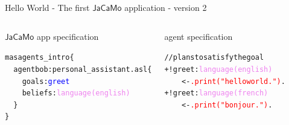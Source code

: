 \documentclass[compress]{beamer}
\newcommand{\jacamo}{$\mathsf{JaCaMo}$\xspace}
\newcommand{\planhead}[1]{\textcolor{indiagreen}{#1}}
\newcommand{\desire}[1]{\textcolor{blue}{#1}}
\newcommand{\instruction}[1]{\textcolor{red}{#1}}
\newcommand{\comment}[1]{\textcolor{harvestgold}{#1}}
\newcommand{\belief}[1]{\textcolor{violet}{#1}}
\begin{document}
\begin{frame}{Hello World - The first \jacamo application - version 2}
%
%
 \begin{columns}
   

     \begin{block}{\jacamo app specification}
     \begin{alltt}\scriptsize
        mas agents\_intro \{\\
        \ \ agent bob: personal\_assistant.asl\{\\
        \ \ \ \ goals: \desire{greet}\\
        \ \ \ \ beliefs: \belief{language(english)}\\
        \ \ \} \\   
      \}      
      \ \\
     \end{alltt}
     \end{block}

     \begin{block}{agent specification}
      \scriptsize
      \begin{alltt}
         
         \comment{//plans to satisfy the goal}  \\
         \planhead{+!greet} : \belief{language(english)} \\
         \ \ \ \ <- \instruction{.print("hello world.")}.\\
    
         \planhead{+!greet} : \belief{language(french)} \\
         \ \ \ \ <- \instruction{.print("bonjour.")}.    
      \end{alltt}
     \end{block}
     
 \end{columns}

\end{frame}
\end{document}
